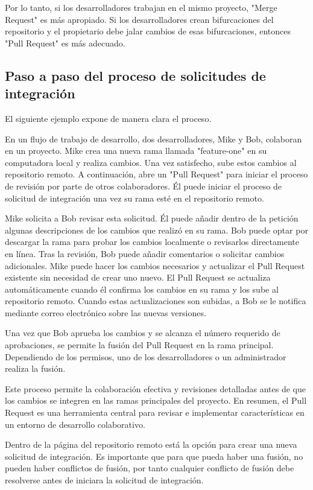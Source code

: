 Por lo tanto, si los desarrolladores trabajan en el mismo proyecto, "Merge Request" es más apropiado. Si los desarrolladores crean bifurcaciones del repositorio y el propietario debe jalar cambios de esas bifurcaciones, entonces "Pull Request" es más adecuado.

\subsection{Paso a paso del proceso de solicitudes de integración}

El siguiente ejemplo expone de manera clara el proceso.

En un flujo de trabajo de desarrollo, dos desarrolladores, Mike y Bob, colaboran en un proyecto. Mike crea una nueva rama llamada "feature-one" en su computadora local y realiza cambios. Una vez satisfecho, sube estos cambios al repositorio remoto. A continuación, abre un "Pull Request" para iniciar el proceso de revisión por parte de otros colaboradores. Él puede iniciar el proceso de solicitud de integración una vez su rama esté en el repositorio remoto.

Mike solicita a Bob revisar esta solicitud. Él puede añadir dentro de la petición algunas descripciones de los cambios que realizó en su rama. Bob puede optar por descargar la rama para probar los cambios localmente o revisarlos directamente en línea. Tras la revisión, Bob puede añadir comentarios o solicitar cambios adicionales. Mike puede hacer los cambios necesarios y actualizar el Pull Request existente sin necesidad de crear uno nuevo. El Pull Request se actualiza automáticamente cuando él confirma los cambios en su rama y los sube al repositorio remoto.  Cuando estas actualizaciones son subidas, a Bob se le notifica mediante correo electrónico sobre las nuevas versiones.

Una vez que Bob aprueba los cambios y se alcanza el número requerido de aprobaciones, se permite la fusión del Pull Request en la rama principal. Dependiendo de los permisos, uno de los desarrolladores o un administrador realiza la fusión.

Este proceso permite la colaboración efectiva y revisiones detalladas antes de que los cambios se integren en las ramas principales del proyecto. En resumen, el Pull Request es una herramienta central para revisar e implementar características en un entorno de desarrollo colaborativo.

Dentro de la página del repositorio remoto está la opción para crear una nueva solicitud de integración. Es importante que para que pueda haber una fusión, no pueden haber conflictos de fusión, por tanto cualquier conflicto de fusión debe resolverse antes de iniciara la solicitud de integración.

